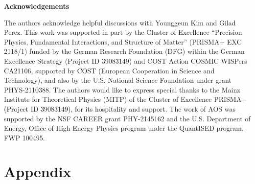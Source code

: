 \documentclass{WileyMSP-template}
\begin{document}
	
	






	
	\medskip
	\textbf{Acknowledgements} \par %
	The authors acknowledge helpful discussions with Younggeun Kim and Gilad Perez. This work was supported in part by the Cluster of Excellence ``Precision Physics, Fundamental Interactions, and Structure of Matter'' (PRISMA+ EXC 2118/1) funded by the German Research Foundation (DFG) within the German Excellence Strategy (Project ID 39083149) and COST Action COSMIC WISPers CA21106, supported by COST (European Cooperation in Science and Technology), and also by the U.S. National Science
	Foundation under grant PHYS-2110388. The authors would like to express special thanks to the Mainz Institute for Theoretical Physics (MITP) of the Cluster of Excellence PRISMA+ (Project ID 39083149), for its hospitality and support. The work of AOS was supported by the NSF CAREER grant PHY-2145162 and the U.S. Department of Energy, Office of High Energy Physics program under the QuantISED program, FWP 100495.

	
	\medskip

	
	

	\section{Appendix}
\end{document}
